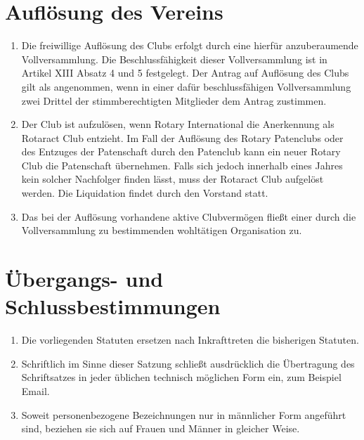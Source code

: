 \documentclass{article}
\begin{document}
\section{Auflösung des Vereins}
\begin{enumerate}
    \item Die freiwillige Auflösung des Clubs erfolgt durch eine hierfür anzuberaumende Vollversammlung. Die Beschlussfähigkeit dieser Vollversammlung ist in Artikel XIII Absatz 4 und 5 festgelegt. Der Antrag auf Auflösung des Clubs gilt als angenommen, wenn in einer dafür beschlussfähigen Vollversammlung zwei Drittel der stimmberechtigten Mitglieder dem Antrag zustimmen.
    \item Der Club ist aufzulösen, wenn Rotary International die Anerkennung als Rotaract Club entzieht. Im Fall der Auflösung des Rotary Patenclubs oder des Entzuges der Patenschaft durch den Patenclub kann ein neuer Rotary Club die Patenschaft übernehmen. Falls sich jedoch innerhalb eines Jahres kein solcher Nachfolger finden lässt, muss der Rotaract Club aufgelöst werden. Die Liquidation findet durch den Vorstand statt.
    \item Das bei der Auflösung vorhandene aktive Clubvermögen fließt einer durch die Vollversammlung zu bestimmenden wohltätigen Organisation zu.
\end{enumerate}

\section{Übergangs- und Schlussbestimmungen}
\begin{enumerate}
    \item Die vorliegenden Statuten ersetzen nach Inkrafttreten die bisherigen Statuten.
    \item \glqq{}Schriftlich\grqq{} im Sinne dieser Satzung schließt ausdrücklich die Übertragung des Schriftsatzes in jeder üblichen technisch möglichen Form ein, zum Beispiel Email.
    \item Soweit personenbezogene Bezeichnungen nur in männlicher Form angeführt sind, beziehen sie sich auf Frauen und Männer in gleicher Weise.
\end{enumerate}
\end{document}
